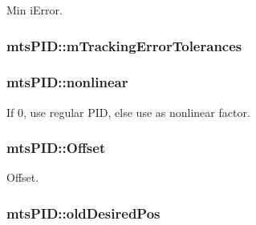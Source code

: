 Min i\+Error. 

\hypertarget{classmts_p_i_d_aad179eaa7eaf2157c2afb60a3d2c4f5d}{}
\subsubsection[{m\+Tracking\+Error\+Tolerances}]{ mts\+P\+I\+D\+::m\+Tracking\+Error\+Tolerances\hspace{0.3cm}{\ttfamily [protected]}}\label{classmts_p_i_d_aad179eaa7eaf2157c2afb60a3d2c4f5d}
\hypertarget{classmts_p_i_d_a999fa0d68f5e49a7d26a9cf60ee738c7}{}
\subsubsection[{nonlinear}]{ mts\+P\+I\+D\+::nonlinear\hspace{0.3cm}{\ttfamily [protected]}}\label{classmts_p_i_d_a999fa0d68f5e49a7d26a9cf60ee738c7}


If 0, use regular P\+I\+D, else use as nonlinear factor. 

\hypertarget{classmts_p_i_d_a34993725f4bc1309971924b62549376c}{}
\subsubsection[{Offset}]{ mts\+P\+I\+D\+::\+Offset\hspace{0.3cm}{\ttfamily [protected]}}\label{classmts_p_i_d_a34993725f4bc1309971924b62549376c}


Offset. 

\hypertarget{classmts_p_i_d_a9bd5876d1e7062eafd4dde4e2914adab}{}
\subsubsection[{old\+Desired\+Pos}]{ mts\+P\+I\+D\+::old\+Desired\+Pos\hspace{0.3cm}{\ttfamily [protected]}}\label{classmts_p_i_d_a9bd5876d1e7062eafd4dde4e2914adab}


